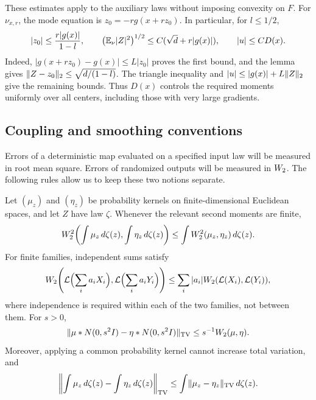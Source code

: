 These estimates apply to the auxiliary laws without imposing convexity
on \(F\). For \(\nu_{x,r}\), the mode equation is
\(z_0=-r g(x+rz_0)\). In particular, for \(l\le1/2\),
\begin{equation}\label{eq:primitive-moments}
 |z_0|\le\frac{r|g(x)|}{1-l},\qquad
 \bigl(\mathbb E_\nu|Z|^2\bigr)^{1/2}
      \le C(\sqrt d+r|g(x)|),\qquad |u|\le CD(x).
\end{equation}
Indeed, \(|g(x+rz_0)-g(x)|\le L|z_0|\) proves the first bound,
and the lemma gives \(\lVert Z-z_0\rVert_2\le\sqrt{d/(1-l)}\).
The triangle inequality and
\(|u|\le|g(x)|+L\lVert Z\rVert_2\) give the remaining bounds.
Thus \(D(x)\) controls the required moments uniformly over all
centers, including those with very large gradients.

\subsection{Coupling and smoothing conventions}

Errors of a deterministic map evaluated on a specified
input law will be measured in root mean square. Errors of
randomized outputs will be measured in \(W_2\). The
following rules allow us to keep these two notions separate.

\begin{lemma}\label{lem:coupling-smoothing}
Let \((\mu_z)\) and \((\eta_z)\) be probability kernels on
finite-dimensional Euclidean spaces, and let \(Z\) have
law \(\zeta\). Whenever the relevant second moments are finite,
\[
 W_2^2\!\left(\int\mu_z\,d\zeta(z),\int\eta_z\,d\zeta(z)\right)
       \le\int W_2^2(\mu_z,\eta_z)\,d\zeta(z).
\]
For finite families, independent sums satisfy
\[
 W_2\!\left(\mathcal L\Bigl(\sum_i a_iX_i\Bigr),
             \mathcal L\Bigl(\sum_i a_iY_i\Bigr)\right)
 \le\sum_i|a_i|W_2(\mathcal L(X_i),\mathcal L(Y_i)),
\]
where independence is required within each of the two
families, not between them.
For \(s>0\),
\begin{equation}\label{eq:gaussian-smoothing}
 \lVert\mu*N(0,s^2I)-\eta*N(0,s^2I)\rVert_{\mathrm{TV}}
                       \le s^{-1}W_2(\mu,\eta).
\end{equation}
Moreover, applying a common probability kernel cannot
increase total variation, and
\[
 \left\|\int\mu_z\,d\zeta(z)-\int\eta_z\,d\zeta(z)\right\|_{\mathrm{TV}}
       \le\int\lVert\mu_z-\eta_z\rVert_{\mathrm{TV}}\,d\zeta(z).
\]
\end{lemma}

